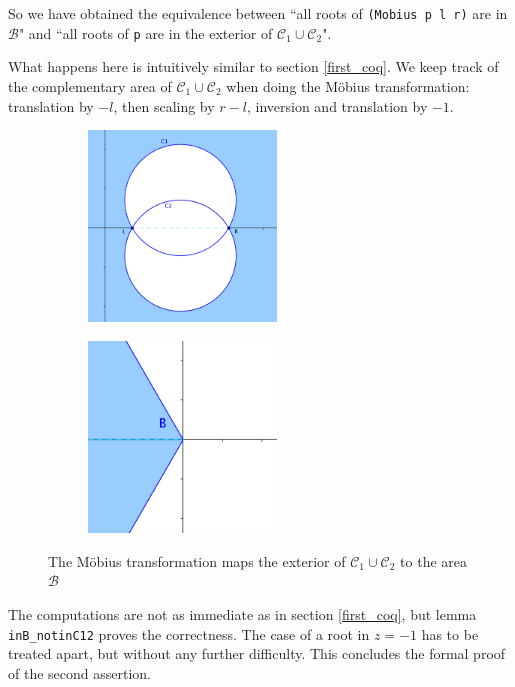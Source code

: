 \documentclass[11pt, a4paper]{article}
\newcommand{\ssb}{{\mathcal B}}
\newcommand{\ssc}{{\mathcal C}}
\begin{document}
So we have obtained the equivalence between ``all roots of  \lstinline!(Mobius p l r)! are in $\ssb$" and ``all roots of \lstinline!p! are in the exterior of $\ssc_1 \cup \ssc_2$".

What happens here is intuitively similar to section \ref{first_coq}. We keep track of the complementary area of $\ssc_1 \cup \ssc_2$ when doing the M\"obius transformation: translation by $-l$, then scaling by $r-l$, inversion and translation by $-1$. 

\begin{figure}[htb!]
 \centering
  \begin{subfigure}
    \centering
    \includegraphics[width=5cm]{3circles_extC12.png}
  \end{subfigure}
  \qquad
  \begin{subfigure}
    \centering
    \includegraphics[width=5cm]{3circles_B1.png}
  \end{subfigure}
  \caption{The M\"obius transformation maps the exterior of $\ssc_1 \cup \ssc_2$ to the area $\ssb$}
  \label{fig_C12}
\end{figure}

The computations are not as immediate as in section \ref{first_coq}, but lemma \lstinline!inB_notinC12! proves the correctness. The case of a root in $z = -1$ has to be treated apart, but without any further difficulty. This concludes the formal proof of the second assertion.
\end{document}
